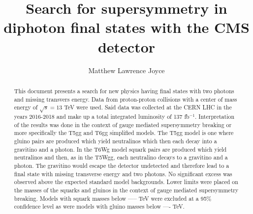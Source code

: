 \documentclass[11pt,modernstyle]{thesis}
\title{Search for supersymmetry in diphoton final states with the CMS detector}
\author{Matthew Lawrence Joyce}
\begin{document}
	\maketitle
	\begin{abstract}
		This document presents a search for new physics having final states with two photons and missing transvers energy.  Data from proton-proton collisions with a center of mass energy of $\sqrt{s}=13$ TeV were used.  Said data was collected at the CERN LHC in the years 2016-2018 and make up a total integrated luminosity of 137 fb$^{-1}$.  Interpretation of the results was done in the context of gauge mediated supersymmetry breaking or more specifically the T5gg and T6gg simplified models.  The T5gg model is one where gluino pairs are produced which yield neutralinos which then each decay into a gravitino and a photon.  In the T6Wg model squark pairs are produced which yield neutralinos and then, as in the T5Wgg, each neutralino decays to a gravitino and a photon.  The gravitino would escape the detector undetected and therefore lead to a final state with missing transverse energy and two photons.  No significant excess was observed above the expected standard model backgrounds.  Lower limits were placed on the masses of the squarks and gluinos in the context of gauge mediated supersymmetry breaking.  Models with squark masses below -----  TeV were excluded at a 95\% confidence level as were models with gluino masses below ---- TeV.
	\end{abstract}
	\tableofcontents
	\listoffigures
	\listoftables
	\begin{linenumbers}	
	
	
	
	
	
	
	
	
	

	\end{linenumbers}
	
	
\end{document}
